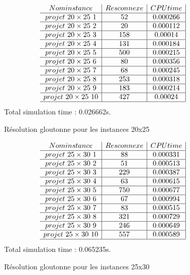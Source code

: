 \documentclass[12pt,a4paper]{article}
\begin{document}
\begin{figure}[H]
\centering

\[
\begin{array}{c|c|c|c}
Nom instance & Res connexe & CPU time \\ \hline
projet \ 20 \times 25 \ 1 &52 & 0.000266\\ \hline 
projet \ 20 \times 25 \ 2 &20 & 0.000112\\ \hline 
projet \ 20 \times 25 \ 3 &158 & 0.00014\\ \hline 
projet \ 20 \times 25 \ 4 &131 & 0.000184\\ \hline
projet \ 20 \times 25 \ 5 &500 & 0.000215\\ \hline 
projet \ 20 \times 25 \ 6 &80 & 0.000356\\ \hline 
projet \ 20 \times 25 \ 7 &68 & 0.000245\\ \hline 
projet \ 20 \times 25 \ 8 &253 & 0.000318\\ \hline 
projet \ 20 \times 25 \ 9 &183 & 0.000214\\ \hline 
projet \ 20 \times 25 \ 10 &427 & 0.00024\\ \hline 
\end{array}\]
Total simulation time : 0.026662s.


\label{Res::Glouton 20x25}
\caption{Résolution gloutonne pour les instances 20x25}
\end{figure}

\begin{figure}[H]
\centering

\[
\begin{array}{c|c|c|c}
Nom instance & Res connexe & CPU time \\ \hline
projet \ 25 \times 30 \ 1 &88 & 0.000331\\ \hline
projet \ 25 \times 30 \ 2 &51 & 0.000513\\ \hline 
projet \ 25 \times 30 \ 3 &229 & 0.000387\\ \hline 
projet \ 25 \times 30 \ 4 &63 & 0.000615\\ \hline 
projet \ 25 \times 30 \ 5 &750 & 0.000677\\ \hline 
projet \ 25 \times 30 \ 6 &67 & 0.000994\\ \hline 
projet \ 25 \times 30 \ 7 &83 & 0.000515\\ \hline 
projet \ 25 \times 30 \ 8 &321 & 0.000729\\ \hline 
projet \ 25 \times 30 \ 9 &246 & 0.000649\\ \hline 
projet \ 25 \times 30 \ 10 &557 & 0.000589\\ \hline 
\end{array}\]
Total simulation time : 0.065235s.

\label{Res::Glouton 25x30}
\caption{Résolution gloutonne pour les instances 25x30}
\end{figure}
\end{document}
